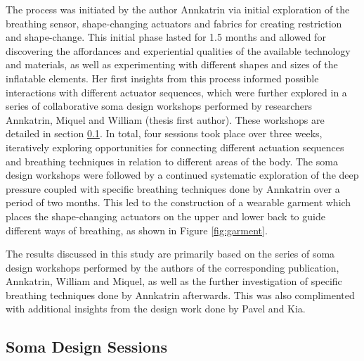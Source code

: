 The process was initiated by the author Annkatrin via initial exploration of the breathing sensor, shape-changing actuators and fabrics for creating restriction and shape-change. This initial phase lasted for 1.5 months and allowed for discovering the affordances and experiential qualities of the available technology and materials, as well as experimenting with different shapes and sizes of the inflatable elements. Her first insights from this process informed possible interactions with different actuator sequences, which were further explored in a series of collaborative soma design workshops \cite{hook_designing_2018} performed by researchers Annkatrin, Miquel and William (thesis first author). These workshops are detailed in section \ref{sec:soma_workshops}. In total, four sessions took place over three weeks, iteratively exploring opportunities for connecting different actuation sequences and breathing techniques in relation to different areas of the body. The soma design workshops were followed by a continued systematic exploration of the deep pressure coupled with specific breathing techniques done by Annkatrin over a period of two months. This led to the construction of a wearable garment which places the shape-changing actuators on the upper and lower back to guide different ways of breathing, as shown in Figure \ref{fig:garment}. 


The results discussed in this study are primarily based on the series of soma design workshops performed by the authors of the corresponding publication, Annkatrin, William and Miquel, as well as the further investigation of specific breathing techniques done by Annkatrin afterwards. This was also complimented with additional insights from the design work done by Pavel and Kia. 

\subsection{Soma Design Sessions}
\label{sec:soma_workshops}

